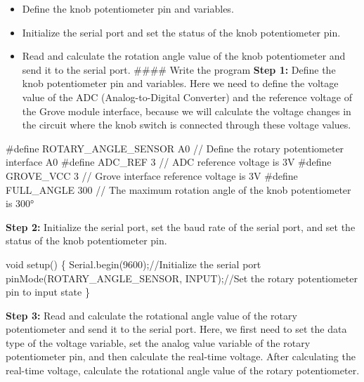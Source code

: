 \documentclass[
  letterpaper,
  DIV=11,
  numbers=noendperiod]{scrreprt}
\newenvironment{Shaded}{\begin{snugshade}}{\end{snugshade}}
\newcommand{\CommentTok}[1]{\textcolor[rgb]{0.37,0.37,0.37}{#1}}
\newcommand{\DataTypeTok}[1]{\textcolor[rgb]{0.68,0.00,0.00}{#1}}
\newcommand{\DecValTok}[1]{\textcolor[rgb]{0.68,0.00,0.00}{#1}}
\newcommand{\NormalTok}[1]{\textcolor[rgb]{0.00,0.23,0.31}{#1}}
\newcommand{\OperatorTok}[1]{\textcolor[rgb]{0.37,0.37,0.37}{#1}}
\newcommand{\PreprocessorTok}[1]{\textcolor[rgb]{0.68,0.00,0.00}{#1}}
\providecommand{\tightlist}{%
  \setlength{\itemsep}{0pt}\setlength{\parskip}{0pt}}\usepackage{longtable,booktabs,array}
\begin{document}
\begin{itemize}
\tightlist
\item
  Define the knob potentiometer pin and variables.
\item
  Initialize the serial port and set the status of the knob
  potentiometer pin.
\item
  Read and calculate the rotation angle value of the knob potentiometer
  and send it to the serial port. \#\#\#\# Write the program
  \textbf{Step 1:} Define the knob potentiometer pin and variables. Here
  we need to define the voltage value of the ADC (Analog-to-Digital
  Converter) and the reference voltage of the Grove module interface,
  because we will calculate the voltage changes in the circuit where the
  knob switch is connected through these voltage values.
\end{itemize}

\begin{Shaded}
\begin{Highlighting}[]
\PreprocessorTok{\#define ROTARY\_ANGLE\_SENSOR }\NormalTok{A0}\PreprocessorTok{  }\CommentTok{// Define the rotary potentiometer interface A0}
\PreprocessorTok{\#define ADC\_REF }\DecValTok{3}\PreprocessorTok{ }\CommentTok{// ADC reference voltage is 3V}
\PreprocessorTok{\#define GROVE\_VCC }\DecValTok{3}\PreprocessorTok{ }\CommentTok{// Grove interface reference voltage is 3V}
\PreprocessorTok{\#define FULL\_ANGLE }\DecValTok{300}\PreprocessorTok{ }\CommentTok{// The maximum rotation angle of the knob potentiometer is 300°}
\end{Highlighting}
\end{Shaded}

\textbf{Step 2:} Initialize the serial port, set the baud rate of the
serial port, and set the status of the knob potentiometer pin.

\begin{Shaded}
\begin{Highlighting}[]
\DataTypeTok{void}\NormalTok{ setup}\OperatorTok{()}
\OperatorTok{\{}
\NormalTok{    Serial}\OperatorTok{.}\NormalTok{begin}\OperatorTok{(}\DecValTok{9600}\OperatorTok{);}\CommentTok{//Initialize the serial port}
\NormalTok{    pinMode}\OperatorTok{(}\NormalTok{ROTARY\_ANGLE\_SENSOR}\OperatorTok{,}\NormalTok{ INPUT}\OperatorTok{);}\CommentTok{//Set the rotary potentiometer pin to input state}
\OperatorTok{\}}
\end{Highlighting}
\end{Shaded}

\textbf{Step 3:} Read and calculate the rotational angle value of the
rotary potentiometer and send it to the serial port. Here, we first need
to set the data type of the voltage variable, set the analog value
variable of the rotary potentiometer pin, and then calculate the
real-time voltage. After calculating the real-time voltage, calculate
the rotational angle value of the rotary potentiometer.
\end{document}
